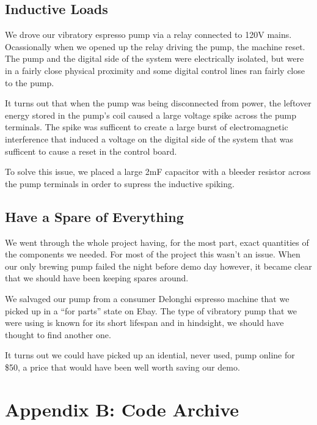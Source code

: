 \documentclass[conference]{IEEEtran}
\begin{document}
\subsection{Inductive Loads}
We drove our vibratory espresso pump via a relay connected to 120V mains.
Ocassionally when we opened up the relay driving the pump, the machine reset.
The pump and the digital side of the system were electrically isolated, but were
in a fairly close physical proximity and some digital control lines ran fairly
close to the pump.

It turns out that when the pump was being disconnected from power, the leftover
energy stored in the pump's coil caused a large voltage spike across the pump
terminals. The spike was sufficent to create a large burst of electromagnetic
interference that induced a voltage on the digital side of the system that was
sufficent to cause a reset in the control board.

To solve this issue, we placed a large 2mF capacitor with a bleeder resistor
across the pump terminals in order to supress the inductive spiking.


\subsection{Have a Spare of Everything}
We went through the whole project having, for the most part, exact quantities of
the components we needed. For most of the project this wasn't an issue. When our
only brewing pump failed the night before demo day however, it became clear that
we should have been keeping spares around. 

We salvaged our pump from a consumer Delonghi espresso machine that we picked
up in a ``for parts'' state on Ebay. The type of vibratory pump that we were
using is known for its short lifespan and in hindsight, we should have thought
to find another one. 

It turns out we could have picked up an idential, never used, pump online for
\$50, a price that would have been well worth saving our demo.

\section{Appendix B: Code Archive}
\end{document}
